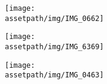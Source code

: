 \hfill
\begin{figure}[b!]
\vspace{-3em}
    \begin{subfigure}[b]{0.3\textwidth}
        \texttt{[image: \\assetpath/img/IMG\_0662]}
        \vspace{-1em}
    \end{subfigure}
    \hfill
    \begin{subfigure}[b]{0.3\textwidth}
        \texttt{[image: \\assetpath/img/IMG\_6369]}
        \vspace{-1em}
    \end{subfigure}
    \hfill
     \begin{subfigure}[b]{0.3\textwidth}
         \texttt{[image: \\assetpath/img/IMG\_0463]}
         \vspace{-1em}
     \end{subfigure}
\end{figure}
